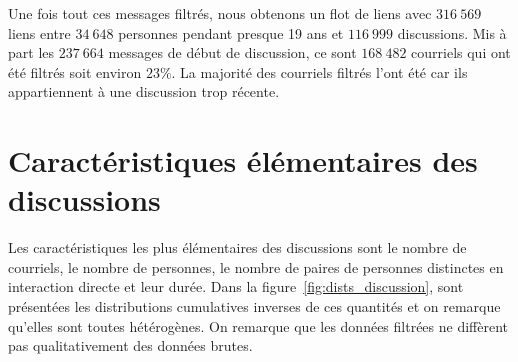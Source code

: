 Une fois tout ces messages filtrés, nous obtenons un flot de liens avec $316\ 569$ liens entre $34\ 648$ personnes pendant presque 19 ans et $116\ 999$ discussions.
Mis à part les $237\ 664$ messages de début de discussion, ce sont $168\ 482$ courriels qui ont été filtrés soit environ $23\%$.
La majorité des courriels filtrés l'ont été car ils appartiennent à une discussion trop récente.

\section{Caractéristiques élémentaires des discussions}

Les caractéristiques les plus élémentaires des discussions sont le nombre de courriels, le nombre de personnes, le nombre de paires de personnes distinctes en interaction directe et leur durée.
Dans la figure~\ref{fig:dists_discussion}, sont présentées les distributions cumulatives inverses de ces quantités et on remarque qu'elles sont toutes hétérogènes.
On remarque que les données filtrées ne diffèrent pas qualitativement des données brutes.

